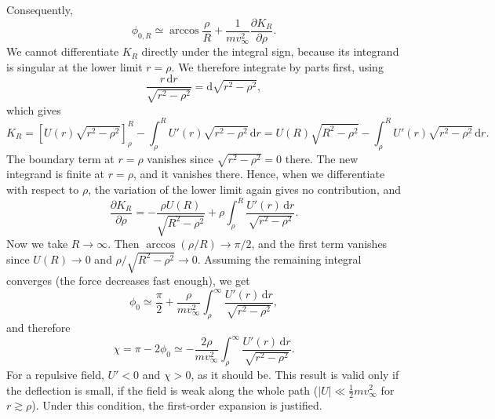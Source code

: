 \begin{problem}[title={Deriving the small-angle scattering formula}]
{Consequently,
\begin{equation*}
    \phi_{0,R} \simeq \arccos{\frac{\rho}{R}} + \frac{1}{mv_\infty^2}\frac{\partial K_R}{\partial\rho}.
\end{equation*}
We cannot differentiate $K_R$ directly under the integral sign, because its integrand is singular at the lower limit $r = \rho$. We therefore integrate by parts first, using
\begin{equation*}
    \frac{r\,\mathrm{d}r}{\sqrt{r^2 - \rho^2}} = \mathrm{d}\sqrt{r^2 - \rho^2},
\end{equation*}
which gives
\begin{equation*}
    K_R = \left[ U(r)\sqrt{r^2 - \rho^2} \right]_\rho^R - \int_\rho^R U'(r)\sqrt{r^2 - \rho^2}\,\mathrm{d}r = U(R)\sqrt{R^2 - \rho^2} - \int_\rho^R U'(r)\sqrt{r^2 - \rho^2}\,\mathrm{d}r.
\end{equation*}
The boundary term at $r = \rho$ vanishes since $\sqrt{r^2 - \rho^2} = 0$ there. The new integrand is finite at $r = \rho$, and it vanishes there. Hence, when we differentiate with respect to $\rho$, the variation of the lower limit again gives no contribution, and
\begin{equation*}
    \frac{\partial K_R}{\partial\rho} = -\frac{\rho U(R)}{\sqrt{R^2 - \rho^2}} + \rho\int_\rho^R \frac{U'(r)\,\mathrm{d}r}{\sqrt{r^2 - \rho^2}}.
\end{equation*}
Now we take $R \to \infty$. Then $\arccos(\rho/R) \to \pi/2$, and the first term vanishes since $U(R) \to 0$ and $\rho/\sqrt{R^2 - \rho^2} \to 0$. Assuming the remaining integral converges (\ie the force decreases fast enough), we get
\begin{equation*}
    \phi_0 \simeq \frac{\pi}{2} + \frac{\rho}{mv_\infty^2}\int_\rho^\infty \frac{U'(r)\,\mathrm{d}r}{\sqrt{r^2 - \rho^2}},
\end{equation*}
and therefore
\begin{equation*}
    \chi = \pi - 2\phi_0 \simeq -\frac{2\rho}{mv_\infty^2}\int_\rho^\infty \frac{U'(r)\,\mathrm{d}r}{\sqrt{r^2 - \rho^2}}.
\end{equation*}
For a repulsive field, $U' < 0$ and $\chi > 0$, as it should be. This result is valid only if the deflection is small, \ie if the field is weak along the whole path ($|U| \ll \frac{1}{2}mv_\infty^2$ for $r \gtrsim \rho$). Under this condition, the first-order expansion is justified.

}
\end{problem}
